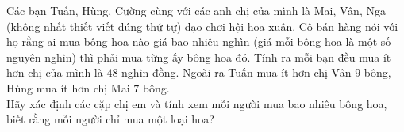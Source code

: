 \begin{bt}
	Các bạn Tuấn, Hùng, Cường cùng với các anh chị của mình là Mai, Vân, Nga (không nhất thiết viết đúng thứ tự) dạo chơi hội hoa xuân. Cô bán hàng nói với họ rằng ai mua bông hoa nào giá bao nhiêu nghìn (giá mỗi bông hoa là một số nguyên nghìn) thì phải mua từng ấy bông hoa đó. Tính ra mỗi bạn đều mua ít hơn chị của mình là $48$ nghìn đồng. Ngoài ra Tuấn mua ít hơn chị Vân $9$ bông, Hùng mua ít hơn chị Mai $7$ bông. \\
	Hãy xác định các cặp chị em và tính xem mỗi người mua bao nhiêu bông hoa, biết rằng mỗi người chỉ mua một loại hoa?
\end{bt}
